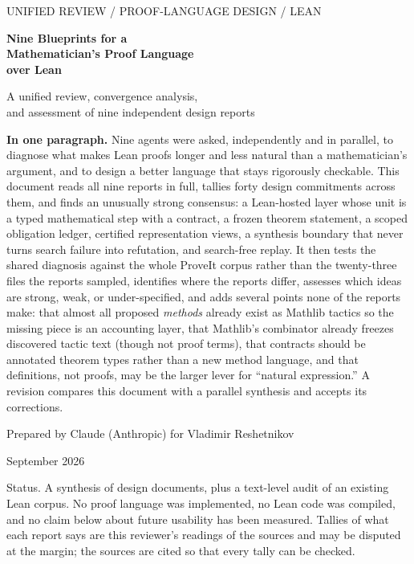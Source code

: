 \documentclass[11pt,a4paper]{article}
\newcommand{\code}[1]{\texttt{\detokenize{#1}}}
\theoremstyle{definition}
\begin{document}
\begin{titlepage}
\vspace*{12mm}
{\sffamily\small\color{muted}UNIFIED REVIEW \quad / \quad PROOF-LANGUAGE DESIGN \quad / \quad LEAN\par}
\vspace{10mm}
{\sffamily\bfseries\color{ink}\fontsize{28}{34}\selectfont Nine Blueprints for a\\Mathematician's Proof Language\\over Lean\par}
\vspace{6mm}
{\sffamily\LARGE A unified review, convergence analysis,\\and assessment of nine independent design reports\par}
\vspace{12mm}
\begin{keybox}
\textbf{In one paragraph.} Nine agents were asked, independently and in parallel, to diagnose what makes Lean proofs longer and less natural than a mathematician's argument, and to design a better language that stays rigorously checkable. This document reads all nine reports in full, tallies forty design commitments across them, and finds an unusually strong consensus: a Lean-hosted layer whose unit is a typed mathematical step with a contract, a frozen theorem statement, a scoped obligation ledger, certified representation views, a synthesis boundary that never turns search failure into refutation, and search-free replay. It then tests the shared diagnosis against the whole ProveIt corpus rather than the twenty-three files the reports sampled, identifies where the reports differ, assesses which ideas are strong, weak, or under-specified, and adds several points none of the reports make: that almost all proposed \emph{methods} already exist as Mathlib tactics so the missing piece is an accounting layer, that Mathlib's \code{says} combinator already freezes discovered tactic text (though not proof terms), that contracts should be annotated theorem types rather than a new method language, and that definitions, not proofs, may be the larger lever for ``natural expression.'' A revision compares this document with a parallel synthesis and accepts its corrections.
\end{keybox}
\vfill
{\sffamily Prepared by Claude (Anthropic) for Vladimir Reshetnikov\par}
{ September 2026\par}
\vspace{4mm}
{\small\color{muted}Status. A synthesis of design documents, plus a text-level audit of an existing Lean corpus. No proof language was implemented, no Lean code was compiled, and no claim below about future usability has been measured. Tallies of what each report says are this reviewer's readings of the sources and may be disputed at the margin; the sources are cited so that every tally can be checked.\par}
\end{titlepage}
\end{document}
